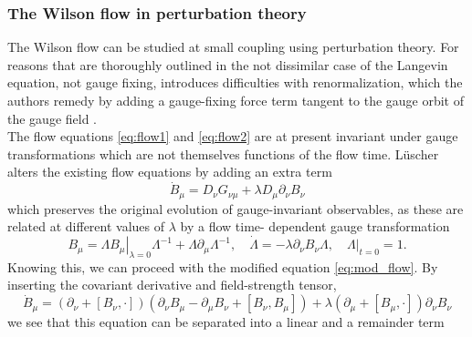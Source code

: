 \documentclass[a4paper,10pt]{article}
\begin{document}
\subsubsection{The Wilson flow in perturbation theory}
The Wilson flow can be studied at small coupling using perturbation theory. For reasons that are thoroughly outlined in the not dissimilar case of the Langevin equation, not gauge fixing, introduces difficulties with renormalization, which the authors remedy by adding a gauge-fixing force term tangent to the gauge orbit of the gauge field \cite{Zinn-JustinJ1988Wift}.\\The flow equations \eqref{eq:flow1} and \eqref{eq:flow2} are at present invariant under gauge transformations which are not themselves functions of the flow time. Lüscher alters the existing flow equations by adding an extra term
\begin{equation}\label{eq:mod_flow}
\dot{B}_{\mu}=D_{\nu} G_{\nu \mu}+\lambda D_{\mu} \partial_{\nu} B_{\nu}
\end{equation}
which preserves the original evolution of gauge-invariant observables, as these are related at different values of $\lambda$ by a flow time- dependent gauge transformation
\begin{equation}
B_{\mu}=\left.\Lambda B_{\mu}\right|_{\lambda=0} \Lambda^{-1}+\Lambda \partial_{\mu} \Lambda^{-1}, \quad \dot{\Lambda}=-\lambda \partial_{\nu} B_{\nu} \Lambda,\left.\quad \Lambda\right|_{t=0}=1.
\end{equation}
Knowing this, we can proceed with the modified equation \eqref{eq:mod_flow}. By inserting the covariant derivative and field-strength tensor, 
\begin{equation}
\dot{B}_{\mu}=\left(\partial_{\nu}+\left[B_{\nu}, \cdot\right]\right)\left(\partial_{\nu} B_{\mu}-\partial_{\mu} B_{\nu}+\left[B_{\nu}, B_{\mu}\right]\right)+\lambda \left(\partial_{\mu}+\left[B_{\mu}, \cdot\right]\right) \partial_{\nu} B_{\nu}
\end{equation}
we see that this equation can be separated into a linear and a remainder term
\end{document}
